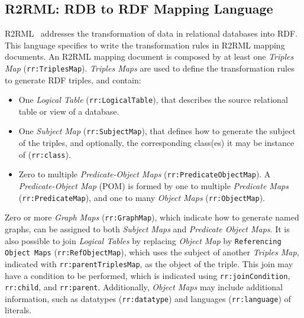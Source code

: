 \subsection{R2RML: RDB to RDF Mapping Language}
\label{sec:chp2_R2RML}

R2RML~\parencite{das2012r2rml} addresses the transformation of data in relational databases into RDF. This language specifies to write the transformation rules in R2RML mapping documents. An R2RML mapping document is composed by at least one \textit{Triples Map} (\texttt{rr:TriplesMap}). \textit{Triples Maps} are used to define the transformation rules to generate RDF triples, and contain:

\begin{itemize}
    \item One \textit{Logical Table} (\texttt{rr:LogicalTable}), that describes the source relational table or view of a database.
    \item One \textit{Subject Map} (\texttt{rr:SubjectMap}), that defines how to generate the subject of the triples, and optionally, the corresponding class(es) it may be instance of (\texttt{rr:class}).
    \item Zero to multiple \textit{Predicate-Object Maps} (\texttt{rr:PredicateObjectMap}). A \textit{Predicate-Object Map} (POM) is formed by one to multiple \textit{Predicate Maps} (\texttt{rr:PredicateMap}), and one to many \textit{Object Maps} (\texttt{rr:ObjectMap}).%
\end{itemize}

Zero or more \textit{Graph Maps} (\texttt{rr:GraphMap}), which indicate how to generate named graphs, can be assigned to both \textit{Subject Maps} and \textit{Predicate Object Maps}. 
It is also possible to join \textit{Logical Tables} by replacing \textit{Object Map} by \texttt{Referencing Object Maps} (\texttt{rr:RefObjectMap}), which uses the subject of another \textit{Triples Map}, indicated with \texttt{rr:parentTriplesMap}, as the object of the triple. 
This join may have a condition to be performed, which is indicated using \texttt{rr:joinCondition}, \texttt{rr:child}, and \texttt{rr:parent}. 
Additionally, \textit{Object Maps} may include additional information, such as datatypes (\texttt{rr:datatype}) and languages (\texttt{rr:language}) of literals. 


